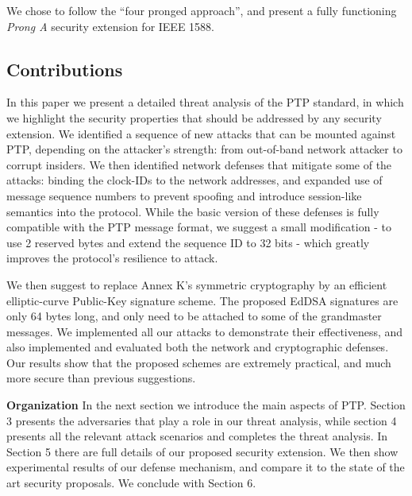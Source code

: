 \documentclass[11pt]{article}
\begin{document}
We chose to follow the ``four pronged approach'', and present a fully functioning \emph{Prong A} security extension for IEEE 1588.



\subsection{Contributions}\label{contributions}





In this paper we present a detailed threat analysis of the PTP standard, in which we highlight the security properties that should be addressed by any security extension. We identified a sequence of new attacks that can be mounted against PTP, depending on the attacker's strength: from out-of-band network attacker to corrupt insiders. We then identified network defenses that mitigate some of the attacks: binding the clock-IDs to the network addresses, and expanded use of message sequence numbers to prevent spoofing and introduce session-like semantics into the protocol. While the basic version of these defenses is fully compatible with the PTP message format, we suggest a small modification - to use 2 reserved bytes and extend the sequence ID to 32 bits - which greatly improves the protocol's resilience to attack.



We then suggest to replace Annex K's symmetric cryptography by an efficient elliptic-curve Public-Key signature scheme. The proposed EdDSA signatures are only 64 bytes long, and only need to be attached to some of the grandmaster messages. We implemented all our attacks to demonstrate their effectiveness, and also implemented and evaluated both the network and cryptographic defenses. Our results show that the proposed schemes are extremely practical, and much more secure than previous suggestions.



\textbf{Organization} In the next section we introduce the main aspects of PTP. Section 3 presents the adversaries that play a role in our threat analysis, while section 4 presents all the relevant attack scenarios and completes the threat analysis. In Section 5 there are full details of our proposed security extension. We then show experimental results of our defense mechanism, and compare it to the state of the art security proposals. We conclude with Section 6.
\end{document}
